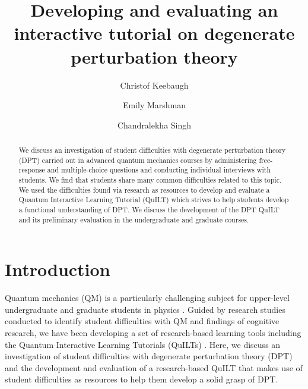\documentclass[aps,pra,showpacs,showkeys,twocolumn,groupedaddress]{revtex4-1}
\begin{document}

\title{Developing and evaluating an interactive tutorial on degenerate perturbation theory}
\author{Christof Keebaugh}
\author{Emily Marshman}
\author{Chandralekha Singh}
 

\begin{abstract}
 We discuss an investigation of student difficulties with degenerate perturbation theory (DPT) carried out in advanced quantum mechanics courses by administering free-response and multiple-choice questions and conducting individual interviews with students. We find that students share many common difficulties related to this topic. We used the difficulties found via research as resources to develop and evaluate a Quantum Interactive Learning Tutorial (QuILT) which strives to help students develop a functional understanding of DPT. We discuss the development of the DPT QuILT and its preliminary evaluation in the undergraduate and graduate courses. 
\end{abstract}

\maketitle

\section{Introduction}
\vspace*{-.09in}

Quantum mechanics (QM) is a particularly challenging subject for upper-level undergraduate and graduate students in physics \cite{singh, wittmann,zollman,singh2}.  
Guided by research studies conducted to identify student difficulties with QM and findings of cognitive research, we have been developing a set of research-based learning tools including the Quantum Interactive Learning Tutorials (QuILTs) \cite{zhu,singh3,singh4}.  Here, we discuss an investigation of student difficulties with degenerate perturbation theory (DPT) and the development and evaluation of a research-based QuILT that makes use of student difficulties as resources to help them develop a solid grasp of DPT.
\end{document}
